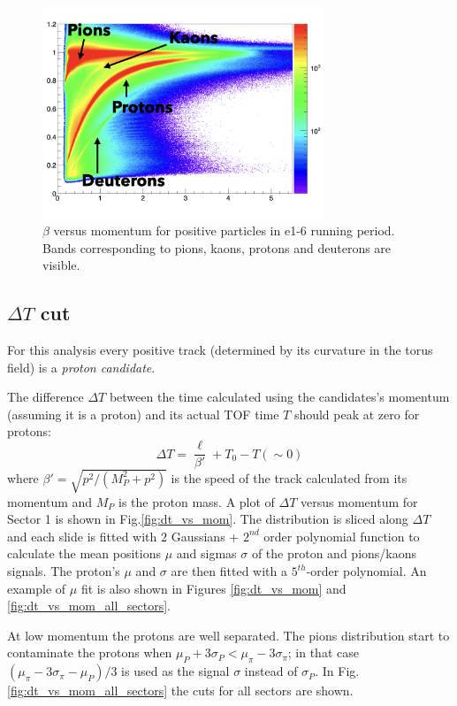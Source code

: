 \begin{figure}[h]
  \centering
		\includegraphics[width=0.75\textwidth ]{img/beta_vs_mom}
		\caption{ $\beta$ versus momentum for positive particles in e1-6 running period. Bands
                    corresponding to pions, kaons, protons and deuterons are visible.}
 		\label{fig:beta_vs_mom}
\end{figure}

\subsection{$\Delta T$ cut}
\label{sec:clas_timing}

For this analysis every positive track (determined by its curvature in the torus field) 
is a {\it proton candidate}.

The difference $\Delta T$ between the time calculated using
the candidates's momentum (assuming it is a proton) and its actual TOF time $T$ 
should peak at zero for protons:
\begin{equation}
 \label{eq:protondt}
  \Delta T = \frac{\ell}{\beta'} + T_{0} - T (\sim0 )
\end{equation}
where $\beta' = \sqrt{ p^2 /( M_P^2 + p^2 ) }$ is the speed of the track calculated from its
momentum and $M_P$ is the proton mass. 
A plot of $\Delta T$ versus momentum for Sector 1 is shown in 
Fig.\ref{fig:dt_vs_mom}. The distribution is sliced along $\Delta T$ and each slide is fitted
with $2$ Gaussians + $2^{nd}$ order polynomial function to calculate the mean 
positions $\mu$ and sigmas $\sigma$ of the proton and pions/kaons signals. 
The proton's $\mu$ and $\sigma$ are then fitted with a $5^{th}$-order polynomial. 
An example of $\mu$ fit is also shown in 
Figures \ref{fig:dt_vs_mom} and \ref{fig:dt_vs_mom_all_sectors}.

At low momentum the protons are well separated.  The pions distribution 
start to contaminate the protons when
$\mu_{P} + 3\sigma_{P} < \mu_{\pi} - 3\sigma_{\pi}$;  in that case 
$(\mu_{\pi} - 3\sigma_{\pi} - \mu_{P})/3$ is used as the signal $\sigma$ instead of $\sigma_{P}$.
In Fig.\ref{fig:dt_vs_mom_all_sectors} the cuts for all sectors are shown. 

